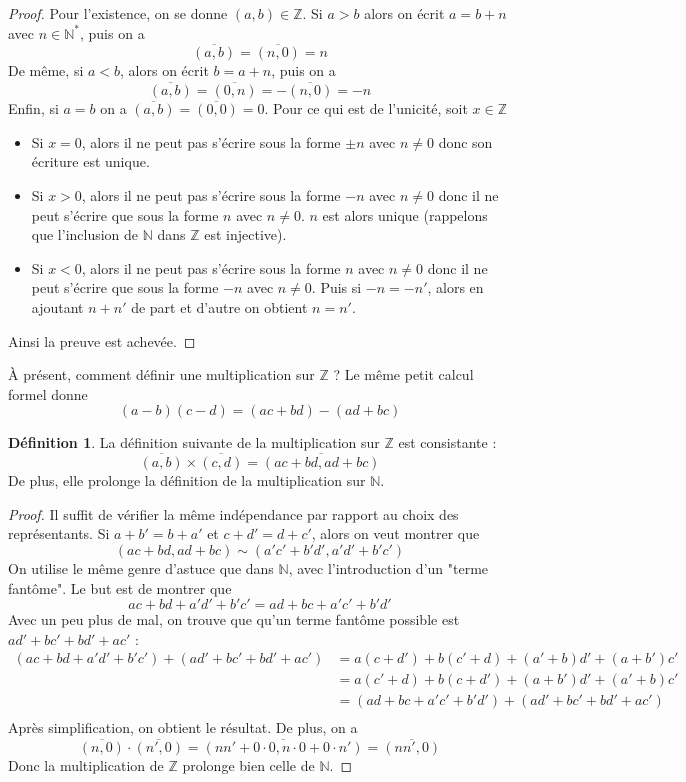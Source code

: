 \documentclass[french]{book}
\newcommand{\N}{\mathbb{N}}
\newcommand{\Z}{\mathbb{Z}}
\theoremstyle{plain}
\theoremstyle{definition}
\newtheorem{dfn}{Définition}[chapter]
\theoremstyle{remark}
\begin{document}
\begin{proof}
	Pour l'existence, on se donne $(a,b) \in \mathbb{Z}$. Si $a > b$ alors on écrit $a = b+n$ avec $n \in \mathbb{N}^*$, puis on a 
$$\overline{(a,b)} = \overline{(n,0)} = n$$
De même, si $a < b$, alors on écrit $b = a+n$, puis on a
$$\overline{(a,b)} = \overline{(0,n)} = -\overline{(n,0)} = -n$$
Enfin, si $a = b$ on a $\overline{(a,b)} = \overline{(0,0)} = 0$. Pour ce qui est de l'unicité, soit $x \in \mathbb{Z}$
\begin{itemize}
	\item Si $x = 0$, alors il ne peut pas s'écrire sous la forme $\pm n$ avec $n \neq 0$ donc son écriture est unique.
	\item Si $x > 0$, alors il ne peut pas s'écrire sous la forme $-n$ avec $n \neq 0$ donc il ne peut s'écrire que sous la forme $n$ avec $n \neq 0$. $n$ est alors unique (rappelons que l'inclusion de $\mathbb{N}$ dans $\mathbb{Z}$ est injective).
	\item Si $x < 0$, alors il ne peut pas s'écrire sous la forme $n$ avec $n \neq 0$ donc il ne peut s'écrire que sous la forme $-n$ avec $n \neq 0$. Puis si $-n = -n'$, alors en ajoutant $n+n'$ de part et d'autre on obtient $n = n'$.
\end{itemize}
Ainsi la preuve est achevée.
\end{proof}
À présent, comment définir une multiplication sur $\Z$ ? Le même petit calcul formel donne $$(a-b)(c-d)=(ac+bd)-(ad+bc)$$
\begin{dfn}
	La définition suivante de la multiplication sur $\Z$ est consistante : $$\overline{(a,b)}\times\overline{(c,d)}=\overline{(ac+bd,ad+bc)}$$ De plus, elle prolonge la définition de la multiplication sur $\N$.
\end{dfn}
\begin{proof}
	Il suffit de vérifier la même indépendance par rapport au choix des représentants. Si $a+b'=b+a'$ et $c+d'=d+{c'}$, alors on veut montrer que $$(ac+bd,ad+bc)\sim(a'c'+b'd',a'd'+b'c')$$
On utilise le même genre d'astuce que dans $\N$, avec l'introduction d'un "terme fantôme". Le but est de montrer que $$ac+bd+a'd'+b'c'=ad+bc+a'c'+b'd'$$
Avec un peu plus de mal, on trouve que qu'un terme fantôme possible est $ad'+bc'+bd'+ac'$ :
\begin{align*}
	(ac+bd+a'd'+b'c')+(ad'+bc'+bd'+ac')&=a(c+d')+b(c'+d)+(a'+b)d'+(a+b')c'\\
	&=a(c'+d)+b(c+d')+(a+b')d'+(a'+b)c'\\
	&=(ad+bc+a'c'+b'd')+(ad'+bc'+bd'+ac')\\
\end{align*}
Après simplification, on obtient le résultat. De plus, on a
$$\overline{(n,0)}\cdot\overline{(n',0)}=\overline{\left(nn'+0\cdot0,n\cdot0+0\cdot n'\right)}=\overline{(nn',0)}$$
Donc la multiplication de $\Z$ prolonge bien celle de $\N$.
\end{proof}
\end{document}
